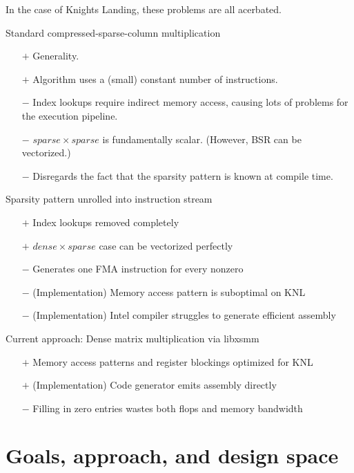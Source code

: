 In the case of Knights Landing, these problems are all acerbated. 


  Standard compressed-sparse-column multiplication
    \begin{itemize}
      \item[$+$] Generality.
      \item[$+$] Algorithm uses a (small) constant number of instructions.
      \item[$-$] Index lookups require indirect memory access, causing lots of problems for the execution pipeline.
      \item[$-$] $sparse \times sparse$ is fundamentally scalar. (However, BSR can be vectorized.)
      \item[$-$] Disregards the fact that the sparsity pattern is known at compile time.
    \end{itemize}

  Sparsity pattern unrolled into instruction stream
    \begin{itemize}
    \item[$+$] Index lookups removed completely
    \item[$+$] $dense \times sparse$ case can be vectorized perfectly 
    \item[$-$] Generates one FMA instruction for every nonzero
    \item[$-$] (Implementation) Memory access pattern is suboptimal on KNL
    \item[$-$] (Implementation) Intel compiler struggles to generate efficient assembly
    \end{itemize}

  Current approach: Dense matrix multiplication via libxsmm
    \begin{itemize}
    \item[$+$] Memory access patterns and register blockings optimized for KNL
    \item[$+$] (Implementation) Code generator emits assembly directly 
    \item[$-$] Filling in zero entries wastes both flops and memory bandwidth
    \end{itemize}


  \section{Goals, approach, and design space}

